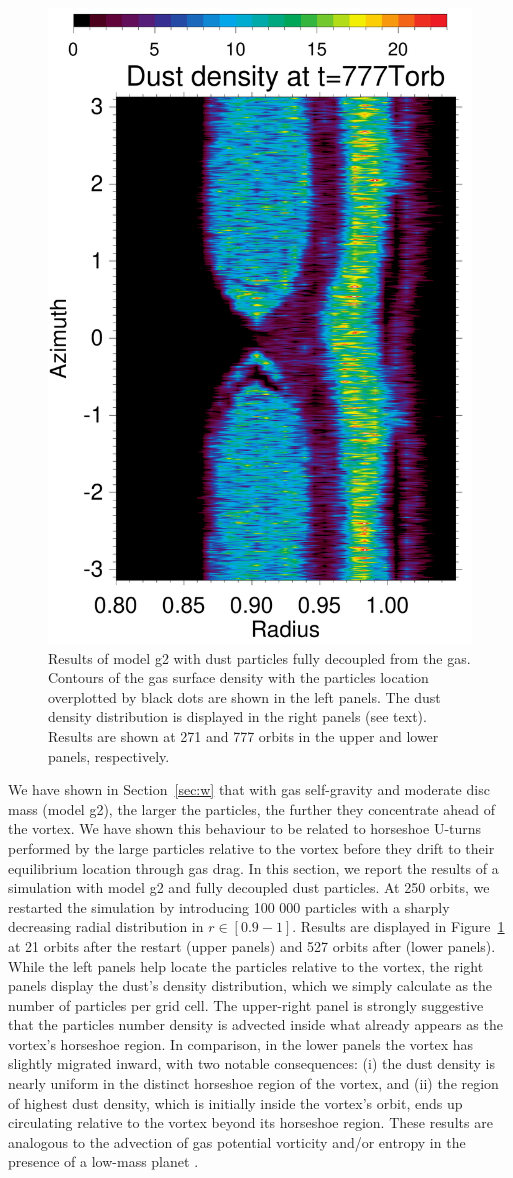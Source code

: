 \documentclass[a4paper,usenatbib]{mnras}
\begin{document}
\begin{figure}
\includegraphics[width=0.49\hsize]{fc1d.pdf}
\caption{\label{fig:pinf}Results of model g2 with dust particles fully
  decoupled from the gas. Contours of the gas surface density with the
  particles location overplotted by black dots are shown in the left
  panels. The dust density distribution is displayed in the right
  panels (see text). Results are shown at 271 and 777 orbits in the
  upper and lower panels, respectively.}
\end{figure}
We have shown in Section~\ref{sec:w} that with gas self-gravity and
moderate disc mass (model g2), the larger the particles, the further
they concentrate ahead of the vortex. We have shown this behaviour to
be related to horseshoe U-turns performed by the large particles
relative to the vortex before they drift to their equilibrium location
through gas drag.  In this section, we report the results of a
simulation with model g2 and fully decoupled dust particles. At 250
orbits, we restarted the simulation by introducing 100 000 particles
with a sharply decreasing radial distribution in
$r\in[0.9-1]$. Results are displayed in Figure~\ref{fig:pinf} at 21
orbits after the restart (upper panels) and 527 orbits after (lower
panels). While the left panels help locate the particles relative to
the vortex, the right panels display the dust's density distribution,
which we simply calculate as the number of particles per grid
cell. The upper-right panel is strongly suggestive that the particles
number density is advected inside what already appears as the vortex's
horseshoe region. In comparison, in the lower panels the vortex has
slightly migrated inward, with two notable consequences: (i) the dust
density is nearly uniform in the distinct horseshoe region of the
vortex, and (ii) the region of highest dust density, which is
initially inside the vortex's orbit, ends up circulating relative to
the vortex beyond its horseshoe region. These results are analogous to
the advection of gas potential vorticity and/or entropy in the
presence of a low-mass planet \citep[e.g.,][]{BaruteauPP6}.
\end{document}
